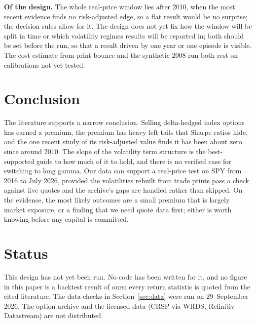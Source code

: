 \documentclass[10pt, a4paper, twocolumn]{article}
\begin{document}
\textbf{Of the design.} The whole real-price window lies after 2010, when the most recent evidence finds no risk-adjusted edge, so a flat result would be no surprise; the decision rules allow for it. The design does not yet fix how the window will be split in time or which volatility regimes results will be reported in; both should be set before the run, so that a result driven by one year or one episode is visible. The cost estimate from print bounce and the synthetic 2008 run both rest on calibrations not yet tested.

\section{Conclusion}
\label{sec:conclusion}

The literature supports a narrow conclusion. Selling delta-hedged index options has earned a premium, the premium has heavy left tails that Sharpe ratios hide, and the one recent study of its risk-adjusted value finds it has been about zero since around 2010. The slope of the volatility term structure is the best-supported guide to how much of it to hold, and there is no verified case for switching to long gamma. Our data can support a real-price test on SPY from 2016 to July 2026, provided the volatilities rebuilt from trade prints pass a check against live quotes and the archive's gaps are handled rather than skipped. On the evidence, the most likely outcomes are a small premium that is largely market exposure, or a finding that we need quote data first; either is worth knowing before any capital is committed.

\section*{Status}

This design has not yet been run. No code has been written for it, and no figure in this paper is a backtest result of ours: every return statistic is quoted from the cited literature. The data checks in Section~\ref{sec:data} were run on 29~September 2026. The option archive and the licensed data (CRSP via WRDS, Refinitiv Datastream) are not distributed.
\end{document}
